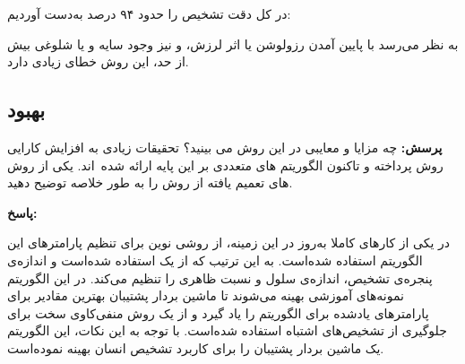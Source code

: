 \documentclass[12pt,a4paper]{article}
\theoremstyle{definition}
\theoremstyle{theorem}
\theoremstyle{definition}
\begin{document}
در کل دقت تشخیص را حدود ۹۴ درصد به‌دست آوردیم: 

\begin{center}
\vspace{-0.1cm}
\end{center}
\vspace{1cm}

به نظر می‌رسد با پایین آمدن رزولوشن یا اثر لرزش، و نیز وجود سایه و یا شلوغی بیش از حد، این روش خطای زیادی دارد. 

\vspace{1cm}
\subsection{بهبود }
\textbf{پرسش: }
چه مزایا و معایبی در این روش می بینید؟ تحقیقات زیادی به افزایش کارایی روش  پرداخته و تاکنون الگوریتم های متعددی بر این پایه ارائه شده اند. یکی از روش های تعمیم یافته از روش  را به طور خلاصه توضیح دهید.


\textbf{پاسخ: } 

در یکی از کارهای کاملا به‌روز در این زمینه\cite{hogimp}، از روشی نوین برای تنظیم پارامترهای این الگوریتم استفاده‌ شده‌است. به این ترتیب که از یک  استفاده شده‌است و اندازه‌ی پنجره‌ی تشخیص، اندازه‌ی سلول و نسبت ظاهری را تنظیم می‌کند. در این الگوریتم نمونه‌های آموزشی بهینه می‌شوند تا ماشین بردار پشتیبان بهترین مقادیر برای پارامترهای یادشده برای الگوریتم را یاد گیرد و از یک روش منفی‌کاوی سخت برای جلوگیری از تشخیص‌های اشتباه استفاده شده‌است. با توجه به این نکات، این الگوریتم یک ماشین بردار پشتیبان را برای کاربرد تشخیص انسان بهینه نموده‌است. 
\end{document}
